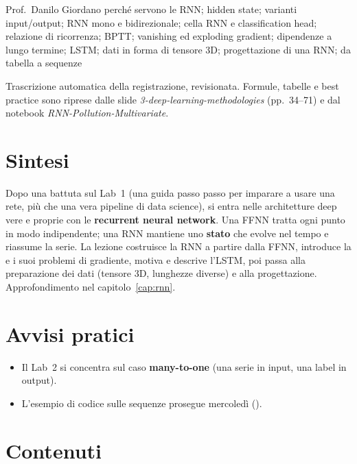   {Prof.~Danilo Giordano}
  {perché servono le RNN; hidden state; varianti input/output; RNN mono e bidirezionale; cella RNN e
   classification head; relazione di ricorrenza; BPTT; vanishing ed exploding gradient; dipendenze a
   lungo termine; LSTM; dati in forma di tensore 3D; progettazione di una RNN; da tabella a sequenze}
\label{lez:2026-10-12}

\begin{nota}[Fonte]
Trascrizione automatica della registrazione, revisionata. Formule, tabelle e best practice sono
riprese dalle slide \emph{3-deep-learning-methodologies} (pp.~34--71) e dal notebook
\emph{RNN-Pollution-Multivariate}.
\end{nota}

\section{Sintesi}
Dopo una battuta sul Lab~1 (una guida passo passo per imparare a usare una rete, più che una vera
pipeline di data science), si entra nelle architetture deep vere e proprie con le
\textbf{recurrent neural network}. Una FFNN tratta ogni punto in modo indipendente; una RNN mantiene
uno \textbf{stato} che evolve nel tempo e riassume la serie. La lezione costruisce la RNN a partire
dalla FFNN, introduce la  e i suoi problemi di gradiente, motiva e
descrive l'LSTM, poi passa alla preparazione dei dati (tensore 3D, lunghezze diverse) e alla
progettazione. Approfondimento nel capitolo~\ref{cap:rnn}.

\section{Avvisi pratici}
\begin{itemize}
  \item Il Lab~2 si concentra sul caso \textbf{many-to-one} (una serie in input, una label in output).
  \item L'esempio di codice sulle sequenze prosegue mercoledì ().
\end{itemize}

\section{Contenuti}

